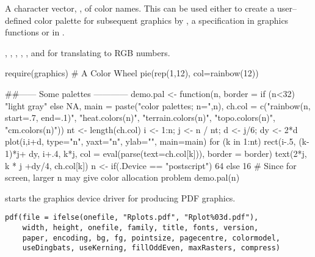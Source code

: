 %
\begin{Value}
A character vector, , of color names.  This can be used
either to create a user--defined color palette for subsequent
graphics by , a  specification
in graphics functions or in .
\end{Value}
%
\begin{SeeAlso}\relax
{}, , ,
, ,  and
 for translating to RGB numbers.
\end{SeeAlso}
%
\begin{Examples}
\begin{ExampleCode}
require(graphics)
# A Color Wheel
pie(rep(1,12), col=rainbow(12))

##------ Some palettes ------------
demo.pal <-
  function(n, border = if (n<32) "light gray" else NA,
           main = paste("color palettes;  n=",n),
           ch.col = c("rainbow(n, start=.7, end=.1)", "heat.colors(n)",
                      "terrain.colors(n)", "topo.colors(n)",
                      "cm.colors(n)"))
{
    nt <- length(ch.col)
    i <- 1:n; j <- n / nt; d <- j/6; dy <- 2*d
    plot(i,i+d, type="n", yaxt="n", ylab="", main=main)
    for (k in 1:nt) {
        rect(i-.5, (k-1)*j+ dy, i+.4, k*j,
             col = eval(parse(text=ch.col[k])), border = border)
        text(2*j,  k * j +dy/4, ch.col[k])
    }
}
n <- if(.Device == "postscript") 64 else 16
     # Since for screen, larger n may give color allocation problem
demo.pal(n)
\end{ExampleCode}
\end{Examples}
%
\begin{Description}\relax
{} starts the graphics device driver for producing PDF
graphics.
\end{Description}
%
\begin{Usage}
\begin{verbatim}
pdf(file = ifelse(onefile, "Rplots.pdf", "Rplot%03d.pdf"),
    width, height, onefile, family, title, fonts, version,
    paper, encoding, bg, fg, pointsize, pagecentre, colormodel,
    useDingbats, useKerning, fillOddEven, maxRasters, compress)
\end{verbatim}
\end{Usage}
%
